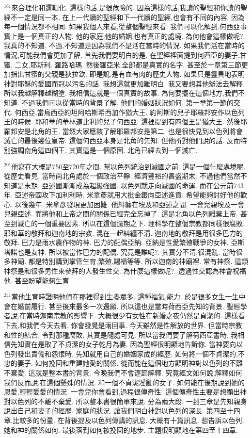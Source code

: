 \documentclass{book}
\begin{document}
$^{161}$來合理化和邏輯化.
這樣的話,是很危險的.
因為這樣的話,我讀的聖經和你讀的聖經不一定是同一本.
在上一代讀的聖經和下一代讀的聖經,也會有不同的內容.
因為每一個情況都不相同.
如果我個人來看,從整個聖經來看.
我們可以化解到,何西亞事實上是一個真正的人物.
他的家庭,他的婚姻,也有真正的處境.
為何他會這樣做呢?.
我真的不知道.
不過,不知道是因為我們不是活在當時的情況.
如果我們活在當時的情況,可能我們會更加了解.
首先我們要明白的是.
在聖經裡面提到何西亞的妻子,甘蜜.
二女,耶斯利.
羅路哈瑪.
然後羅亞米,全部都是真實的名字.
甚至於一章第三節更加指出甘蜜的父親是狄拉欽.
即是說,是有血有肉的歷史人物.
如果只是靈異地表明神對耶穌的愛國而冠以污名的話.
我想這就更加難明白.
我又要想其他辦法去解釋.
所以我越解釋越糊塗.
我相信這就是一個真實的故事.
為何要擺在這個地方,我們不知道.
不過我們可以從當時的背景了解.
他們的婚姻狀況如何.
第一章第一節的交代.
何西亞,當烏西亞約坦阿哈斯希西加作猶大王.
約阿斯的兒子耶羅邦安作以色列王的時候.
耶和華的華林道比利的兒子何西亞.
這裡提到有四個王是猶大王.
然後耶羅邦安是北角的王.
當然大家應該了解耶羅邦安是第二.
也是很快見到以色列將會滅亡的最後幾位皇帝.
這個何西亞本身是北角的先知.
但他所對他們說的話.
反而特別強調南角這四個王.
其實這是一個原因.
北角已經去到一個滅亡.

$^{201}$他寫在大概是750至720年之間.
幫以色列統治到滅國之前.
這是一個什麼處境呢.
從歷史看見.
當時南北角處於一個政治平靜.
經濟豐裕的昌盛期末.
不過他們當然不知道是末期.
亞述國漸漸成為超級強國.
以色列就走向滅國的命運.
而在公元前743年.
亞述帝國攻下加利利時.
米拿彥就用大批金銀向亞述進貢.
希望能夠討好他的歡心.
以後幾年.
米拿彥發現更加困難.
他糾纏在埃及和亞述之間.
一會兒親埃及一會兒親亞述.
而將他和上帝之間的關係已經完全忘掉了.
這是北角以色列離棄上帝.
甚至到滅亡的一個重要因素.
所以在這個逾期之下.
理科學在整個宗教都同樣很腐敗.
耶和華的敬拜和迦南地的宗教.
混在一起糾纏不清.
迦南地的敬拜是用很多巴力的敬拜.
巴力是雨水農作物的神.
巴力的配偶亞納.
亞納是性愛繁殖戰爭的女神.
亞斯塔諾也是女神.
所以被當作巴力的配偶.
究竟是誰呢?.
其實分不清,很混亂.
當時很多神廟.
都是特別講到掌管生育,繁殖,賜福等等.
所以迦南的神廟裡.
常有神祭.
這類神祭是和很多男性來參拜的人發生性交.
為什麼這樣做呢?.
透過性交認為神會祝福他.
甚至盼望能夠生育.

$^{241}$當他生育時證明他們在那裡得到生養眾多.
這種福氣,能力.
於是很多女生一生中會在婚前履行.
甚至後來最多一次還願.
所以這也是當時荷西亞先知的背景.
聖經學者說,在當時迦南宗教的影響下.
大概很少有女性在新婚之夜仍然是貞潔的.
這樣看下去,和我們今天去看.
你會發覺是兩回事.
今天雖然是性解放的世界.
但當時宗教和性的結合.
令到那種腐敗.
其實是隨處可見.
所以當我們要了解荷西亞書時.
我相信先知實在是取了不貞潔的女子乾月為妻.
因為聖經很明顯地告訴你.
當神要向以色列發出責備和怨恨時.
先知就用自己的婚姻家成的經歷.
如何將一個不貞潔的,不忠的妻子.
如何挽回和重建她愛的關係.
從而能在這個地方顯明神對以色列的不離不棄愛.
這就是整本書的背景.
今晚我們不會逐節解釋.
究竟經文如何說,解釋如何.
我們反而說,在這個懸殊的情況.
和一個不貞潔淫亂的女子.
如何能在後期說到她的恩愛,輕輕愛愛的情況.
一會兒你會看到,過程很傳奇性.
這個傳奇性主要是想顯出神對以色列的不離不棄愛.
所以整本書很簡單來說.
分為兩大段.
一到三章是先知親身說出自己和妻子的經歷.
家庭的狀況.
讓我們明白神對以色列的深長.
第四至十四章,比較多的份量.
在背後提及以色列傳講的訊息.
大概有十篇訊息.
想告訴以色列,她和神的關係如何.
最後落到如何被挽回的地步.
主題很明顯地在第四至十四章.
\end{document}
